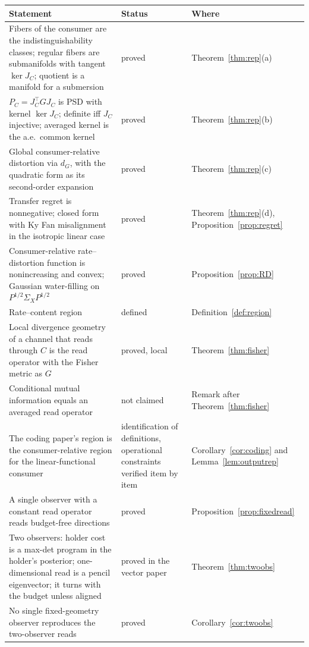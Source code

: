 \documentclass[11pt]{article}
\theoremstyle{definition}
\theoremstyle{remark}
\newcommand{\PC}{P_{C}}
\newcommand{\dG}{d_{G}}
\begin{document}
\begin{center}
\footnotesize
\begin{tabular}{p{} p{} p{}}
\toprule
Statement & Status & Where \\
\midrule
Fibers of the consumer are the indistinguishability classes; regular fibers are submanifolds with tangent $\ker J_{C}$; quotient is a manifold for a submersion & proved & Theorem~\ref{thm:rep}(a) \\
$\PC=J_{C}^{\top}GJ_{C}$ is PSD with kernel $\ker J_{C}$; definite iff $J_{C}$ injective; averaged kernel is the a.e.\ common kernel & proved & Theorem~\ref{thm:rep}(b) \\
Global consumer-relative distortion via $\dG$, with the quadratic form as its second-order expansion & proved & Theorem~\ref{thm:rep}(c) \\
Transfer regret is nonnegative; closed form with Ky Fan misalignment in the isotropic linear case & proved & Theorem~\ref{thm:rep}(d), Proposition~\ref{prop:regret} \\
Consumer-relative rate--distortion function is nonincreasing and convex; Gaussian water-filling on $P^{1/2}\Sigma_{X}P^{1/2}$ & proved & Proposition~\ref{prop:RD} \\
Rate--content region & defined & Definition~\ref{def:region} \\
Local divergence geometry of a channel that reads through $C$ is the read operator with the Fisher metric as $G$ & proved, local & Theorem~\ref{thm:fisher} \\
Conditional mutual information equals an averaged read operator & not claimed & Remark after Theorem~\ref{thm:fisher} \\
The coding paper's region is the consumer-relative region for the linear-functional consumer & identification of definitions, operational constraints verified item by item & Corollary~\ref{cor:coding} and Lemma~\ref{lem:outputrep} \\
A single observer with a constant read operator reads budget-free directions & proved & Proposition~\ref{prop:fixedread} \\
Two observers: holder cost is a max-det program in the holder's posterior; one-dimensional read is a pencil eigenvector; it turns with the budget unless aligned & proved in the vector paper & Theorem~\ref{thm:twoobs} \\
No single fixed-geometry observer reproduces the two-observer reads & proved & Corollary~\ref{cor:twoobs} \\

\end{tabular}
\end{center}
\end{document}
